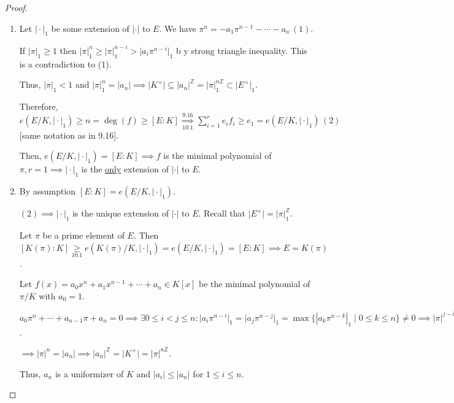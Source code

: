\documentclass[openany]{amsbook}
\numberwithin{section}{chapter}
\theoremstyle{definition}
\begin{document}
\begin{proof}
    \begin{enumerate}[label=\roman*)]
        \item Let \(\vert \cdot \vert_1\) be some extension of \(\vert \cdot \vert\) to \(E\). We have \(\pi^n = - a_1 \pi^{n-1} - \cdots - a_n \, (1)\).

        If \(\vert \pi \vert_1 \geq 1\) then \(\vert \pi \vert_1^n \geq \vert \pi \vert_1^{n-i} > \vert a_i \pi^{n-i} \vert_1\) b y strong triangle inequality. This is a contradiction to (1).
        
        Thus, \(\vert \pi \vert_1 < 1\) and \(\vert \pi \vert_1^n = \vert a_n \vert \implies \vert K^\times \vert \subseteq \vert a_n \vert^\mathbb{Z} = \vert \pi \vert ^{n\mathbb{Z} }_1 \subset \vert E^\times \vert _1\).

        Therefore, \(e(E / K, \vert \cdot \vert_1) \geq n = \deg(f) \geq [E:K] \overset{9.16}{\underset{10.1}{\implies }} \sum_{i=1}^r e_i f_i \geq e_1 = e(E / K, \vert \cdot \vert_1) \,(2)\) [same notation as in 9.16].

        Then, \(e(E / K, \vert \cdot \vert_1) = [E:K] \implies f\) is the minimal polynomial of \(\pi, r = 1 \implies \vert \cdot \vert_1\) is the \underline{only} extension of \(\vert \cdot \vert\) to \(E\).
        
        \item By assumption \([E:K] = e(E / K, \vert \cdot \vert_1)\).
        
        \((2) \implies \vert \cdot \vert_1\) is the unique extension of \(\vert \cdot \vert\) to \(E\). Recall that \(\vert E^\times \vert = \vert \pi \vert_1^\mathbb{Z}\).

        Let \(\pi\) be a prime element of \(E\). Then \([K(\pi):K] \underset{10.1}{\geq} e(K(\pi) / K, \vert \cdot \vert_1) = e(E / K, \vert \cdot \vert_1) = [E:K] \implies E = K(\pi)\).
        
        Let \(f(x) = a_0 x^n + a_1 x^{n-1} + \cdots + a_n \in K[x]\) be the minimal polynomial of \(\pi / K\) with \(a_0 = 1\).
        
        \(a_0 \pi^n + \cdots + a_{n-1} \pi + a_n = 0 \implies \exists 0 \leq i < j \leq n : \vert a_i \pi^{n-i} \vert_1 = \vert a_j \pi^{n-j} \vert_1 = \max\{ \left\vert a_k \pi^{n-k} \right\vert _1 \mid 0 \leq k \leq n \} \neq 0 \implies \vert \pi \vert ^{j - i} = \left\vert \frac{a_j}{a_i} \right\vert \in \vert K^\times \vert \implies j - i = n \implies j = n, i = 0\).

        \(\implies \vert \pi \vert ^ n = \vert a_n \vert \implies \vert a_n \vert ^\mathbb{Z} = \vert K^\times \vert = \vert \pi \vert ^{n\mathbb{Z}}\).

        Thus, \(a_n\) is a uniformizer of \(K\) and \(\vert a_i \vert \leq \vert a_n \vert\) for \(1 \leq i \leq n\).
    \end{enumerate} 
\end{proof}
\end{document}
